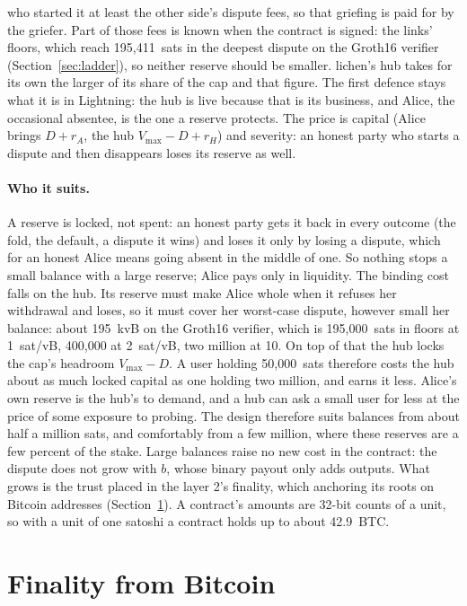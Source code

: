 \documentclass[11pt]{article}
\newcommand{\vmax}{V_{\max}}
\begin{document}
who started it at least the other side's dispute fees, so that griefing
is paid for by the griefer. Part of those fees is known when the
contract is signed: the links' floors, which reach 195,411~sats in the
deepest dispute on the Groth16 verifier (Section~\ref{sec:ladder}), so
neither reserve should be smaller. lichen's hub takes for its own the
larger of its share of the cap and that figure. The first defence stays what it is in Lightning: the hub is
live because that is its business, and Alice, the occasional absentee,
is the one a reserve protects. The price is capital (Alice brings
$D + r_A$, the hub $\vmax - D + r_H$) and severity: an honest party who
starts a dispute and then disappears loses its reserve as well.

\paragraph{Who it suits.} A reserve is locked, not spent: an honest
party gets it back in every outcome (the fold, the default, a dispute it
wins) and loses it only by losing a dispute, which for an honest Alice
means going absent in the middle of one. So nothing stops a small
balance with a large reserve; Alice pays only in liquidity. The binding
cost falls on the hub. Its reserve must make Alice whole when it refuses
her withdrawal and loses, so it must cover her worst-case dispute,
however small her balance: about 195~kvB on the Groth16 verifier, which
is 195,000~sats in floors at 1~sat/vB, 400,000 at 2~sat/vB, two million
at 10. On top of that the hub locks the cap's headroom $\vmax - D$. A
user holding 50,000~sats therefore costs the hub about as much locked
capital as one holding two million, and earns it less. Alice's own
reserve is the hub's to demand, and a hub can ask a small user for less
at the price of some exposure to probing. The design therefore suits
balances from about half a million sats, and comfortably from a few
million, where these reserves are a few percent of the stake. Large
balances raise no new cost in the contract: the dispute does not grow
with $b$, whose binary payout only adds outputs. What grows is the
trust placed in the layer 2's finality, which anchoring its roots on
Bitcoin addresses (Section~\ref{sec:finality}). A contract's amounts
are 32-bit counts of a unit, so with a unit of one satoshi a contract
holds up to about 42.9~BTC.

\section{Finality from Bitcoin}
\label{sec:finality}
\end{document}

